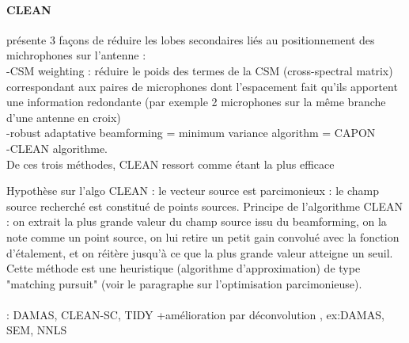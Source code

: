 \paragraph{CLEAN}


\cite{Dougherty1998} présente 3 façons de réduire les lobes secondaires liés au positionnement des michrophones sur l'antenne : \\
-CSM weighting : réduire le poids des termes de la CSM (cross-spectral matrix) correspondant aux paires de microphones dont l'espacement fait qu'ils apportent une information redondante (par exemple 2 microphones sur la même branche d'une antenne en croix)\\
-robust adaptative beamforming = minimum variance algorithm = CAPON\\
-CLEAN algorithme.\\
De ces trois méthodes, CLEAN ressort comme étant la plus efficace

Hypothèse sur l'algo CLEAN : le vecteur source est parcimonieux : le champ source recherché est constitué de points sources. Principe de l'algorithme CLEAN \citep{Hogbom1974} : on extrait la plus grande valeur du champ source issu du beamforming, on la note comme un point source, on lui retire un petit gain convolué avec la fonction d'étalement, et on réitère jusqu'à ce que la plus grande valeur atteigne un seuil. Cette méthode est une heuristique (algorithme d'approximation) de type "matching pursuit" (voir le paragraphe sur l'optimisation parcimonieuse).\\


~\\  : DAMAS, CLEAN-SC, TIDY
+amélioration par déconvolution , ex:DAMAS, SEM, NNLS







